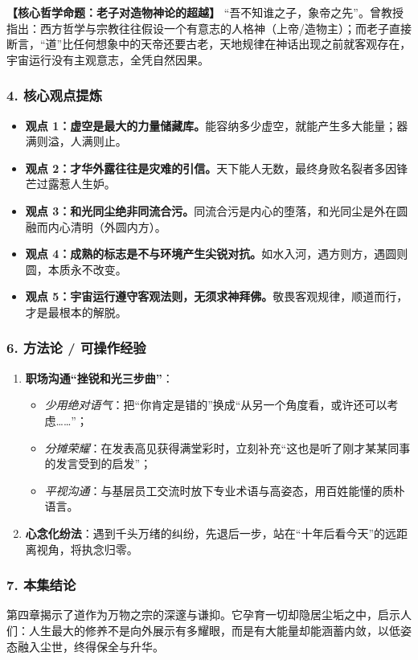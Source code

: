 \noindent\textbf{【核心哲学命题：老子对造物神论的超越】}
“吾不知谁之子，象帝之先”。曾教授指出：西方哲学与宗教往往假设一个有意志的人格神（上帝/造物主）；而老子直接断言，“道”比任何想象中的天帝还要古老，天地规律在神话出现之前就客观存在，宇宙运行没有主观意志，全凭自然因果。

\subsubsection{4. 核心观点提炼}
\begin{itemize}
    \item \textbf{观点 1：虚空是最大的力量储藏库。}能容纳多少虚空，就能产生多大能量；器满则溢，人满则止。
    \item \textbf{观点 2：才华外露往往是灾难的引信。}天下能人无数，最终身败名裂者多因锋芒过露惹人生妒。
    \item \textbf{观点 3：和光同尘绝非同流合污。}同流合污是内心的堕落，和光同尘是外在圆融而内心清明（外圆内方）。
    \item \textbf{观点 4：成熟的标志是不与环境产生尖锐对抗。}如水入河，遇方则方，遇圆则圆，本质永不改变。
    \item \textbf{观点 5：宇宙运行遵守客观法则，无须求神拜佛。}敬畏客观规律，顺道而行，才是最根本的解脱。
\end{itemize}

\subsubsection{6. 方法论 / 可操作经验}
\begin{enumerate}
    \item \textbf{职场沟通“挫锐和光三步曲”}：
    \begin{itemize}
        \item \emph{少用绝对语气}：把“你肯定是错的”换成“从另一个角度看，或许还可以考虑……”；
        \item \emph{分摊荣耀}：在发表高见获得满堂彩时，立刻补充“这也是听了刚才某某同事的发言受到的启发”；
        \item \emph{平视沟通}：与基层员工交流时放下专业术语与高姿态，用百姓能懂的质朴语言。
    \end{itemize}
    \item \textbf{心念化纷法}：遇到千头万绪的纠纷，先退后一步，站在“十年后看今天”的远距离视角，将执念归零。
\end{enumerate}

\subsubsection{7. 本集结论}
第四章揭示了道作为万物之宗的深邃与谦抑。它孕育一切却隐居尘垢之中，启示人们：人生最大的修养不是向外展示有多耀眼，而是有大能量却能涵蓄内敛，以低姿态融入尘世，终得保全与升华。

